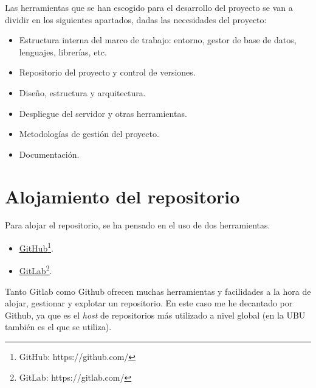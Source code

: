 
Las herramientas que se han escogido para el desarrollo del proyecto se van a dividir en los siguientes apartados, dadas las necesidades del proyecto:

\begin{itemize}
 \item Estructura interna del marco de trabajo: entorno, gestor de base de datos, lenguajes, librerías, etc.
 \item Repositorio del proyecto y control de versiones.
 \item Diseño, estructura y arquitectura.
 \item Despliegue del servidor y otras herramientas.
 \item Metodologías de gestión del proyecto.
 \item Documentación.
\end{itemize}

\section{Alojamiento del repositorio}
Para alojar el repositorio, se ha pensado en el uso de dos herramientas.
\begin{itemize}
\tightlist
 \item \href{https://github.com/}{GitHub}\footnote{GitHub: https://github.com/}.
 \item \href{https://gitlab.com/}{GitLab}\footnote{GitLab: https://gitlab.com/}.
\end{itemize}
Tanto Gitlab como Github ofrecen muchas herramientas y facilidades a la hora de alojar, gestionar y explotar un repositorio. En este caso me he decantado por Github, ya que es el \emph{host} de repositorios más utilizado a nivel global (en la UBU también es el que se utiliza).

